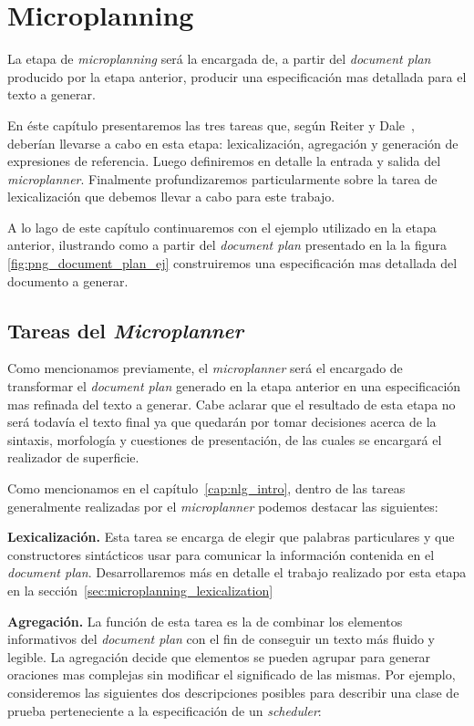 \chapter{Microplanning}
\label{cap:microplanning}

La etapa de \textit{microplanning} será la encargada de, a partir del \textit{document plan} producido por la etapa anterior, producir una especificación mas detallada para el texto a generar. 

En éste capítulo presentaremos las tres tareas que, según Reiter y Dale~\cite{reiter_dale}, deberían llevarse a cabo en esta etapa: lexicalización, agregación y generación de expresiones de referencia. Luego definiremos en detalle la entrada y salida del \textit{microplanner}. Finalmente profundizaremos particularmente sobre la tarea de lexicalización que debemos llevar a cabo para este trabajo.

A lo lago de este capítulo continuaremos con el ejemplo utilizado en la etapa anterior, ilustrando como a partir del \textit{document plan} presentado en la la figura \ref{fig:png_document_plan_ej} construiremos una especificación mas detallada del documento a generar.

\section{Tareas del \textit{Microplanner}}

Como mencionamos previamente, el \textit{microplanner} será el encargado de transformar el \textit{document plan} generado en la etapa anterior en una especificación mas refinada del texto a generar. Cabe aclarar que el resultado de esta etapa no será todavía el texto final ya que quedarán por tomar decisiones acerca de la sintaxis, morfología y cuestiones de presentación, de las cuales se encargará el realizador de superficie.

Como mencionamos en el capítulo~\ref{cap:nlg_intro}, dentro de las tareas generalmente realizadas por el \emph{microplanner} podemos destacar las siguientes:

\medskip
\noindent
\textbf{Lexicalización.} Esta tarea se encarga de elegir que palabras particulares y que constructores sintácticos usar para comunicar la información contenida en el \textit{document plan}. Desarrollaremos más en detalle el trabajo realizado por esta etapa en la sección~\ref{sec:microplanning_lexicalization}


\medskip
\noindent
\textbf{Agregación.} La función de esta tarea es la de combinar los elementos informativos del \emph{document plan} con el fin de conseguir un texto más fluido y legible. La agregación decide que elementos se pueden agrupar para generar oraciones mas complejas sin modificar el significado de las mismas. Por ejemplo, consideremos las siguientes dos descripciones posibles para describir una clase de prueba perteneciente a la especificación de un \emph{scheduler}:

